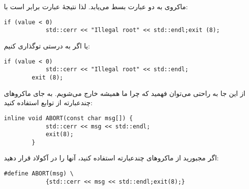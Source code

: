 \section{}
\paragraph{}\label{answer:105}
ماکروی  به دو عبارت بسط می‌یابد. لذا نتیجهٔ عبارت  برابر است با:
\begin{LTR}
    \begin{lstlisting}[style=C++Style]
        if (value < 0)
            std::cerr << "Illegal root" << std::endl;exit (8);
    \end{lstlisting}
\end{LTR}

یا اگر به درستی توگذاری کنیم:
\begin{LTR}
    \begin{lstlisting}[style=C++Style]
        if (value < 0)
            std::cerr << "Illegal root" << std::endl;
        exit (8);
    \end{lstlisting}
\end{LTR}

از این جا به راحتی می‌توان فهمید که چرا ما همیشه خارج می‌شویم. به جای ماکروهای چندعبارته از توابع  استفاده کنید:
\begin{LTR}
    \begin{lstlisting}[style=C++Style]
        inline void ABORT(const char msg[]) {
            std::cerr << msg << std::endl;
            exit(8);
        }
    \end{lstlisting}
\end{LTR}

اگر مجبورید از ماکروهای چندعبارته استفاده کنید، آنها را در آکولاد قرار دهید:
\begin{LTR}
    \begin{lstlisting}[style=C++Style]
        #define ABORT(msg) \
            {std::cerr << msg << std::endl;exit(8);}
    \end{lstlisting}
\end{LTR}
